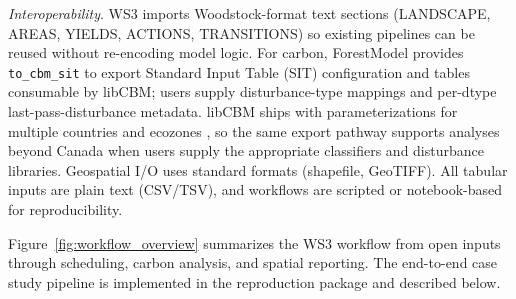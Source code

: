 \documentclass[review]{elsarticle}
\begin{document}
\emph{Interoperability}. WS3 imports Woodstock-format text sections (LANDSCAPE, AREAS, YIELDS, ACTIONS, TRANSITIONS) so existing pipelines can be reused without re-encoding model logic. For carbon, ForestModel provides \texttt{to\_cbm\_sit} to export Standard Input Table (SIT) configuration and tables consumable by libCBM; users supply disturbance-type mappings and per-dtype last-pass-disturbance metadata. libCBM ships with parameterizations for multiple countries and ecozones \citep{kurz2009cbm}, so the same export pathway supports analyses beyond Canada when users supply the appropriate classifiers and disturbance libraries. Geospatial I/O uses standard formats (shapefile, GeoTIFF). All tabular inputs are plain text (CSV/TSV), and workflows are scripted or notebook-based for reproducibility.

Figure~\ref{fig:workflow_overview} summarizes the WS3 workflow from open inputs through scheduling, carbon analysis, and spatial reporting. The end-to-end case study pipeline is implemented in the reproduction package and described below.
\end{document}
